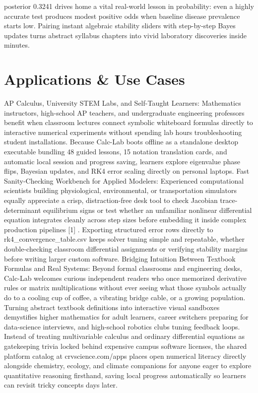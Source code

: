 \documentclass[10pt,letterpaper]{article}
\begin{document}
posterior 0.3241 drives home a vital real-world lesson in probability: even a highly accurate test produces modest positive odds when baseline disease prevalence starts low. Pairing instant algebraic stability sliders with step-by-step Bayes updates turns abstract syllabus chapters into vivid laboratory discoveries inside minutes.

\section{Applications \& Use Cases}
AP Calculus, University STEM Labs, and Self-Taught Learners: Mathematics instructors, high-school AP teachers, and undergraduate engineering professors benefit when classroom lectures connect symbolic whiteboard formulas directly to interactive numerical experiments without spending lab hours troubleshooting student installations. Because Calc-Lab boots offline as a standalone desktop executable bundling 48 guided lessons, 15 notation translation cards, and automatic local session and progress saving, learners explore eigenvalue phase flips, Bayesian updates, and RK4 error scaling directly on personal laptops. Fast Sanity-Checking Workbench for Applied Modelers: Experienced computational scientists building physiological, environmental, or transportation simulators equally appreciate a crisp, distraction-free desk tool to check Jacobian trace-determinant equilibrium signs or test whether an unfamiliar nonlinear differential equation integrates cleanly across step sizes before embedding it inside complex production pipelines [1] . Exporting structured error rows directly to rk4\_convergence\_table.csv keeps solver tuning simple and repeatable, whether double-checking classroom differential assignments or verifying stability margins before writing larger custom software. Bridging Intuition Between Textbook Formulas and Real Systems: Beyond formal classrooms and engineering desks, Calc-Lab welcomes curious independent readers who once memorized derivative rules or matrix multiplications without ever seeing what those symbols actually do to a cooling cup of coffee, a vibrating bridge cable, or a growing population. Turning abstract textbook definitions into interactive visual sandboxes demystifies higher mathematics for adult learners, career switchers preparing for data-science interviews, and high-school robotics clubs tuning feedback loops. Instead of treating multivariable calculus and ordinary differential equations as gatekeeping trivia locked behind expensive campus software licenses, the shared platform catalog at crvscience.com/apps places open numerical literacy directly alongside chemistry, ecology, and climate companions for anyone eager to explore quantitative reasoning firsthand, saving local progress automatically so learners can revisit tricky concepts days later.
\end{document}
